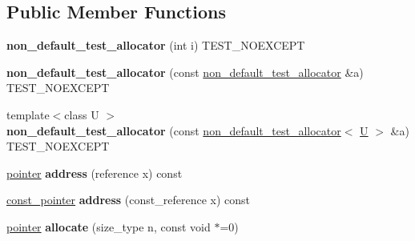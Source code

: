 \subsection*{Public Member Functions}
\begin{DoxyCompactItemize}
\item 
\mbox{\label{classnon__default__test__allocator_ae3a1045bdfdc83965a313327a35d9d71}} 
{\bfseries non\+\_\+default\+\_\+test\+\_\+allocator} (int i) T\+E\+S\+T\+\_\+\+N\+O\+E\+X\+C\+E\+PT
\item 
\mbox{\label{classnon__default__test__allocator_a101470eb5eb9c8e9205ead0137f92452}} 
{\bfseries non\+\_\+default\+\_\+test\+\_\+allocator} (const \mbox{\hyperlink{classnon__default__test__allocator}{non\+\_\+default\+\_\+test\+\_\+allocator}} \&a) T\+E\+S\+T\+\_\+\+N\+O\+E\+X\+C\+E\+PT
\item 
\mbox{\label{classnon__default__test__allocator_a40c860b4d6d2bb2c9c2c01ec8928b458}} 
{\footnotesize template$<$class U $>$ }\\{\bfseries non\+\_\+default\+\_\+test\+\_\+allocator} (const \mbox{\hyperlink{classnon__default__test__allocator}{non\+\_\+default\+\_\+test\+\_\+allocator}}$<$ \mbox{\hyperlink{union_u}{U}} $>$ \&a) T\+E\+S\+T\+\_\+\+N\+O\+E\+X\+C\+E\+PT
\item 
\mbox{\label{classnon__default__test__allocator_a87d26032dd3215fac3f7ff0a614402e9}} 
\mbox{\hyperlink{struct_t}{pointer}} {\bfseries address} (reference x) const
\item 
\mbox{\label{classnon__default__test__allocator_a602585ef7766b65687ad453db9b0ccda}} 
\mbox{\hyperlink{struct_t}{const\+\_\+pointer}} {\bfseries address} (const\+\_\+reference x) const
\item 
\mbox{\label{classnon__default__test__allocator_a204a81f20cdb86f5a42dbc11e9c95040}} 
\mbox{\hyperlink{struct_t}{pointer}} {\bfseries allocate} (size\+\_\+type n, const void $\ast$=0)
\item 
\mbox{\label{classnon__default__test__allocator_af7d503b4b56f259e410d8844819ba1e9}} 

\end{DoxyCompactItemize}
